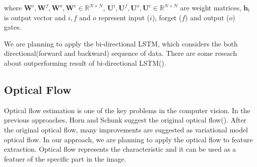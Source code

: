 where $\mathbf{W}^i, \mathbf{W}^f, \mathbf{W}^o, \mathbf{W}^c \in \mathbb{R}^{N \times N}$, $\mathbf{U}^i, \mathbf{U}^f, \mathbf{U}^o, \mathbf{U}^c \in \mathbb{R}^{N \times N}$ are weight matrices, $\mathbf h_t$ is output vector and $i, f$ and $o$ represent input ($i$), forget ($f$) and output ($o$) gates.

We are planning to apply the bi-directional LSTM, which considers the both directional(forward and backward) sequence of data. There are some reseach about outperforming result of bi-directional LSTM(\cite{BiLSTM}). 


\subsection{Optical Flow}

Optical flow estimation is one of the key problems in the computer vision. In the previous approaches, Horn and Schunk suggest the original optical flow(\cite{Horn1993}). After the original optical flow, many improvements are suggested as variational model optical flow. In our approach, we are planning to apply the optical flow to feature extraction. Optical flow represents the characteristic and it can be used as a featuer of the specific part in the image.

